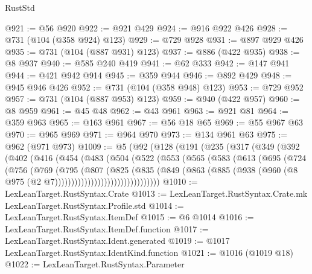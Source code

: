 \begin{lexlean}{RustStd}
\begin{coremodule}
@921 := @56 @920
@922 := @921 @429
@924 := @916 @922 @426
@928 := @731 (@104 (@358 @924) @123)
@929 := @729 @928
@931 := @897 @929 @426
@935 := @731 (@104 (@887 @931) @123)
@937 := @886 (@422 @935)
@938 := @8 @937
@940 := @585 @240 @419
@941 := @62 @333
@942 := @147 @941
@944 := @421 @942 @914
@945 := @359 @944
@946 := @892 @429
@948 := @945 @946 @426
@952 := @731 (@104 (@358 @948) @123)
@953 := @729 @952
@957 := @731 (@104 (@887 @953) @123)
@959 := @940 (@422 @957)
@960 := @8 @959
@961 := @45 @48
@962 := @43 @961
@963 := @921 @81
@964 := @359 @963
@965 := @163 @961
@967 := @56 @18 @65
@969 := @55 @967 @63
@970 := @965 @969
@971 := @964 @970
@973 := @134 @961 @63
@975 := @962 (@971 @973)
@1009 := @5
    (@92
      (@128
        (@191
          (@235
            (@317
              (@349
                (@392
                  (@402
                    (@416
                      (@454
                        (@483
                          (@504
                            (@522
                              (@553
                                (@565
                                  (@583
                                    (@613
                                      (@695
                                        (@724
                                          (@756
                                            (@769
                                              (@795
                                                (@807
                                                  (@825
                                                    (@835
                                                      (@849
                                                        (@863
                                                          (@885
                                                            (@938
                                                              (@960
                                                                (@8
                                                                  @975
                                                                  (@2
                                                                    @7))))))))))))))))))))))))))))))))
@1010 := LexLeanTarget.RustSyntax.Crate
@1013 := LexLeanTarget.RustSyntax.Crate.mk LexLeanTarget.RustSyntax.Profile.std
@1014 := LexLeanTarget.RustSyntax.ItemDef
@1015 := @6 @1014
@1016 := LexLeanTarget.RustSyntax.ItemDef.function
@1017 := LexLeanTarget.RustSyntax.Ident.generated
@1019 := @1017 LexLeanTarget.RustSyntax.IdentKind.function
@1021 := @1016 (@1019 @18)
@1022 := LexLeanTarget.RustSyntax.Parameter

\end{coremodule}
\end{lexlean}
